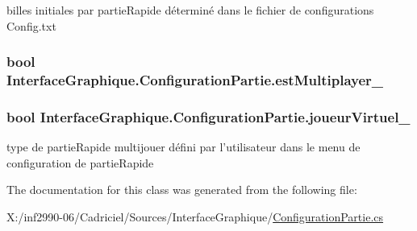 billes initiales par partie\-Rapide déterminé dans le fichier de configurations Config.\-txt 

\hypertarget{class_interface_graphique_1_1_configuration_partie_a039f0afcee48e4f3ccfe5f4211a6e6a6}{
\subsubsection[{est\-Multiplayer\-\_\-}]{\setlength{\rightskip}{0pt plus 5cm}bool Interface\-Graphique.\-Configuration\-Partie.\-est\-Multiplayer\-\_\-}}\label{class_interface_graphique_1_1_configuration_partie_a039f0afcee48e4f3ccfe5f4211a6e6a6}
\hypertarget{class_interface_graphique_1_1_configuration_partie_a166c6a679593d7f6ceb8d6ed4a7a3eff}{
\subsubsection[{joueur\-Virtuel\-\_\-}]{\setlength{\rightskip}{0pt plus 5cm}bool Interface\-Graphique.\-Configuration\-Partie.\-joueur\-Virtuel\-\_\-}}\label{class_interface_graphique_1_1_configuration_partie_a166c6a679593d7f6ceb8d6ed4a7a3eff}


type de partie\-Rapide multijouer défini par l'utilisateur dans le menu de configuration de partie\-Rapide 



The documentation for this class was generated from the following file\-:\begin{DoxyCompactItemize}
\item 
X\-:/inf2990-\/06/\-Cadriciel/\-Sources/\-Interface\-Graphique/\hyperlink{_configuration_partie_8cs}{Configuration\-Partie.\-cs}\end{DoxyCompactItemize}
